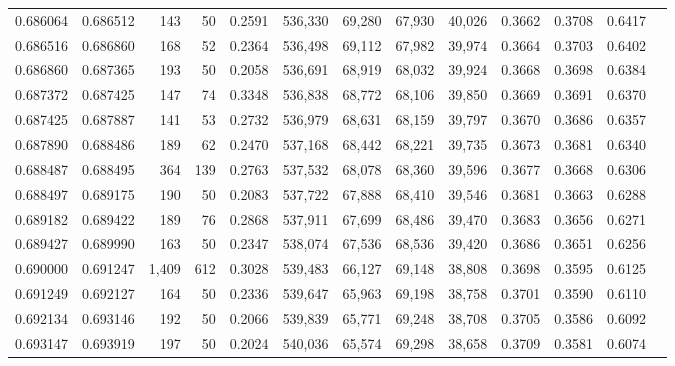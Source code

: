 \begin{tabular}{rrrrrrrrrrrrr}
0.686064 & 0.686512 &   143 &  50 &                                     0.2591 & 536,330 &  69,280 &  67,930 &  40,026 & 0.3662 & 0.3708 & 0.6417 \\
0.686516 & 0.686860 &   168 &  52 &                                     0.2364 & 536,498 &  69,112 &  67,982 &  39,974 & 0.3664 & 0.3703 & 0.6402 \\
0.686860 & 0.687365 &   193 &  50 &                                     0.2058 & 536,691 &  68,919 &  68,032 &  39,924 & 0.3668 & 0.3698 & 0.6384 \\
0.687372 & 0.687425 &   147 &  74 &                                     0.3348 & 536,838 &  68,772 &  68,106 &  39,850 & 0.3669 & 0.3691 & 0.6370 \\
0.687425 & 0.687887 &   141 &  53 &                                     0.2732 & 536,979 &  68,631 &  68,159 &  39,797 & 0.3670 & 0.3686 & 0.6357 \\
0.687890 & 0.688486 &   189 &  62 &                                     0.2470 & 537,168 &  68,442 &  68,221 &  39,735 & 0.3673 & 0.3681 & 0.6340 \\
0.688487 & 0.688495 &   364 & 139 &                                     0.2763 & 537,532 &  68,078 &  68,360 &  39,596 & 0.3677 & 0.3668 & 0.6306 \\
0.688497 & 0.689175 &   190 &  50 &                                     0.2083 & 537,722 &  67,888 &  68,410 &  39,546 & 0.3681 & 0.3663 & 0.6288 \\
0.689182 & 0.689422 &   189 &  76 &                                     0.2868 & 537,911 &  67,699 &  68,486 &  39,470 & 0.3683 & 0.3656 & 0.6271 \\
0.689427 & 0.689990 &   163 &  50 &                                     0.2347 & 538,074 &  67,536 &  68,536 &  39,420 & 0.3686 & 0.3651 & 0.6256 \\
0.690000 & 0.691247 & 1,409 & 612 &                                     0.3028 & 539,483 &  66,127 &  69,148 &  38,808 & 0.3698 & 0.3595 & 0.6125 \\
0.691249 & 0.692127 &   164 &  50 &                                     0.2336 & 539,647 &  65,963 &  69,198 &  38,758 & 0.3701 & 0.3590 & 0.6110 \\
0.692134 & 0.693146 &   192 &  50 &                                     0.2066 & 539,839 &  65,771 &  69,248 &  38,708 & 0.3705 & 0.3586 & 0.6092 \\
0.693147 & 0.693919 &   197 &  50 &                                     0.2024 & 540,036 &  65,574 &  69,298 &  38,658 & 0.3709 & 0.3581 & 0.6074 \\

\end{tabular}
